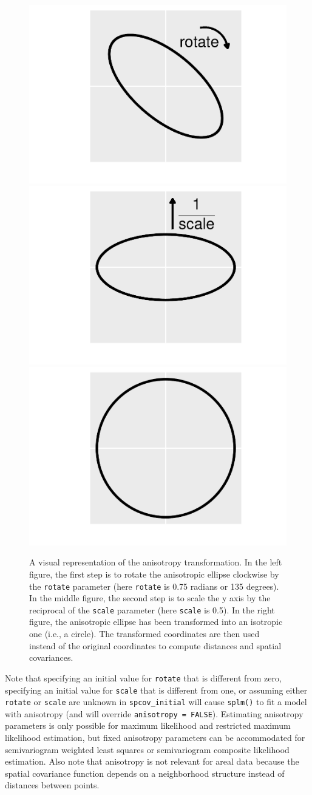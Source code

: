 \documentclass[10pt,letterpaper]{article}
\begin{document}
\begin{figure}
\includegraphics[width=0.33\linewidth]{preprint_files/figure-latex/anisotropy_fit-1} \includegraphics[width=0.33\linewidth]{preprint_files/figure-latex/anisotropy_fit-2} \includegraphics[width=0.33\linewidth]{preprint_files/figure-latex/anisotropy_fit-3} \caption{A visual representation of the anisotropy transformation. In the left figure, the first step is to rotate the anisotropic ellipse clockwise by the \texttt{rotate} parameter (here \texttt{rotate} is 0.75 radians or 135 degrees). In the middle figure, the second step is to scale the y axis by the reciprocal of the \texttt{scale} parameter (here \texttt{scale} is 0.5). In the right figure, the anisotropic ellipse has been transformed into an isotropic one (i.e., a circle). The transformed coordinates are then used instead of the original coordinates to compute distances and spatial covariances.}\label{fig:anisotropy_fit}
\end{figure}

Note that specifying an initial value for \texttt{rotate} that is
different from zero, specifying an initial value for \texttt{scale} that
is different from one, or assuming either \texttt{rotate} or
\texttt{scale} are unknown in \texttt{spcov\_initial} will cause
\texttt{splm()} to fit a model with anisotropy (and will override
\texttt{anisotropy\ =\ FALSE}). Estimating anisotropy parameters is only
possible for maximum likelihood and restricted maximum likelihood
estimation, but fixed anisotropy parameters can be accommodated for
semivariogram weighted least squares or semivariogram composite
likelihood estimation. Also note that anisotropy is not relevant for
areal data because the spatial covariance function depends on a
neighborhood structure instead of distances between points.
\end{document}
